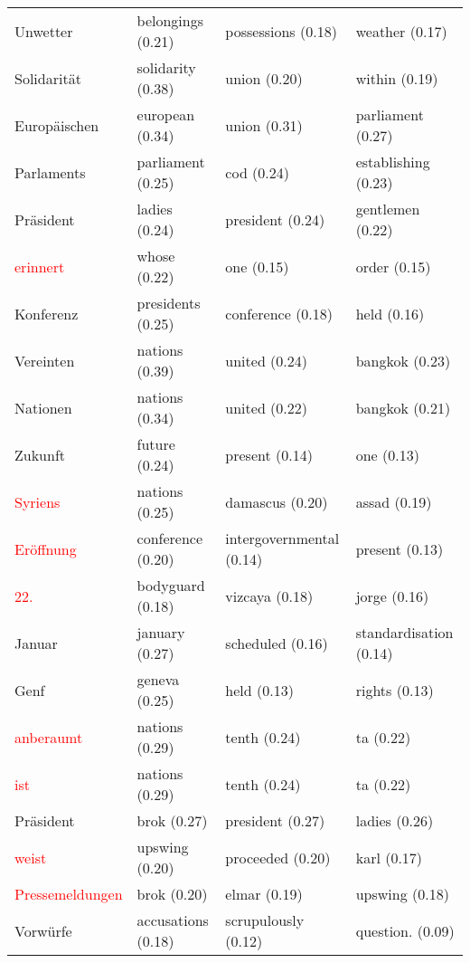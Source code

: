 \documentclass[11pt,twoside,openright]{mpreport}
\begin{document}
\begin{scriptsize}
\begin{tabular}{|llll|}
Unwetter                & belongings (0.21) & possessions (0.18) & weather (0.17) \\ %
Solidarität            & solidarity (0.38) & union (0.20) & within (0.19) \\ %
Europäischen           & european (0.34) & union (0.31) & parliament (0.27) \\ %
Parlaments              & parliament (0.25) & cod (0.24) & establishing (0.23) \\ %
Präsident              & ladies (0.24) & president (0.24) & gentlemen (0.22) \\ %
\textcolor{red}{erinnert}                & whose (0.22) & one (0.15) & order (0.15) \\
Konferenz               & presidents (0.25) & conference (0.18) & held (0.16) \\ %
Vereinten               & nations (0.39) & united (0.24) & bangkok (0.23) \\ %
Nationen                & nations (0.34) & united (0.22) & bangkok (0.21) \\ %
Zukunft                 & future (0.24) & present (0.14) & one (0.13) \\ %
\textcolor{red}{Syriens}                 & nations (0.25) & damascus (0.20) & assad (0.19) \\
\textcolor{red}{Eröffnung}              & conference (0.20) & intergovernmental (0.14) & present (0.13) \\
\textcolor{red}{22.}                     & bodyguard (0.18) & vizcaya (0.18) & jorge (0.16) \\
Januar                  & january (0.27) & scheduled (0.16) & standardisation (0.14) \\ %
Genf                    & geneva (0.25) & held (0.13) & rights (0.13) \\ %
\textcolor{red}{anberaumt}               & nations (0.29) & tenth (0.24) & ta (0.22) \\
\textcolor{red}{ist}                     & nations (0.29) & tenth (0.24) & ta (0.22) \\
Präsident              & brok (0.27) & president (0.27) & ladies (0.26) \\ %
\textcolor{red}{weist}                   & upswing (0.20) & proceeded (0.20) & karl (0.17) \\
\textcolor{red}{Pressemeldungen}         & brok (0.20) & elmar (0.19) & upswing (0.18) \\
Vorwürfe               & accusations (0.18) & scrupulously (0.12) & question. (0.09) \\ %

\end{tabular}
\end{scriptsize}
\end{document}
